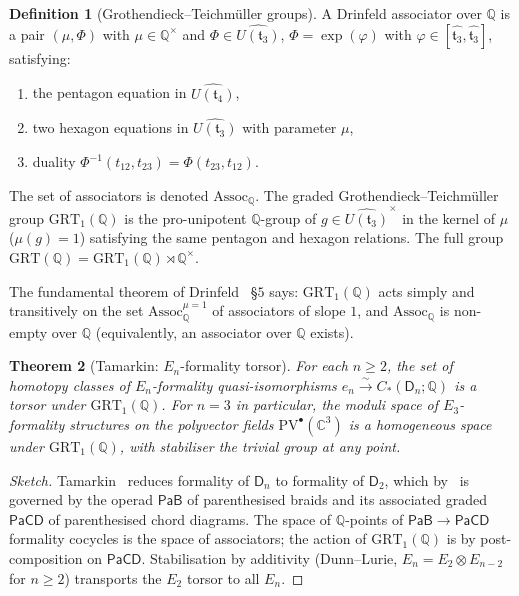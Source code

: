 \documentclass[11pt]{amsart}
\theoremstyle{plain}
\newtheorem{theorem}{Theorem}[section]
\theoremstyle{definition}
\newtheorem{definition}[theorem]{Definition}
\theoremstyle{remark}
\providecommand{\C}{\mathbb{C}}
\providecommand{\Q}{\mathbb{Q}}
\providecommand{\GRT}{\mathrm{GRT}}
\providecommand{\PaB}{\mathsf{PaB}}
\providecommand{\PaCD}{\mathsf{PaCD}}
\providecommand{\frakt}{\mathfrak{t}}
\providecommand{\PV}{\mathrm{PV}}
\begin{document}
\begin{definition}[Grothendieck--Teichm\"uller groups]
\label{def:gt-grt}
A Drinfeld associator over $\Q$ is a pair $(\mu, \Phi)$ with $\mu \in \Q^\times$ and $\Phi \in \widehat{U(\frakt_3)}$, $\Phi = \exp(\varphi)$ with $\varphi \in [\widehat{\frakt_3}, \widehat{\frakt_3}]$, satisfying:
\begin{enumerate}
\item the pentagon equation in $\widehat{U(\frakt_4)}$,
\item two hexagon equations in $\widehat{U(\frakt_3)}$ with parameter $\mu$,
\item duality $\Phi^{-1}(t_{12}, t_{23}) = \Phi(t_{23}, t_{12})$.
\end{enumerate}
The set of associators is denoted $\mathrm{Assoc}_\Q$. The graded Grothendieck--Teichm\"uller group $\GRT_1(\Q)$ is the pro-unipotent $\Q$-group of $g \in \widehat{U(\frakt_3)}^\times$ in the kernel of $\mu$ \textup{(}$\mu(g) = 1$\textup{)} satisfying the same pentagon and hexagon relations. The full group $\GRT(\Q) = \GRT_1(\Q) \rtimes \Q^\times$.
\end{definition}

The fundamental theorem of Drinfeld~\cite{Drinfeld1990} \S$5$ says: $\GRT_1(\Q)$ acts simply and transitively on the set $\mathrm{Assoc}_\Q^{\mu = 1}$ of associators of slope $1$, and $\mathrm{Assoc}_\Q$ is non-empty over $\Q$ \textup{(}equivalently, an associator over $\Q$ exists\textup{)}.

\begin{theorem}[Tamarkin: $E_n$-formality torsor]
\label{thm:tamarkin-torsor}
For each $n \geq 2$, the set of homotopy classes of $E_n$-formality quasi-isomorphisms $e_n \xrightarrow{\sim} C_*(\mathsf{D}_n; \Q)$ is a torsor under $\GRT_1(\Q)$. For $n = 3$ in particular, the moduli space of $E_3$-formality structures on the polyvector fields $\PV^\bullet(\C^3)$ is a homogeneous space under $\GRT_1(\Q)$, with stabiliser the trivial group at any point.
\end{theorem}

\begin{proof}[Sketch]
Tamarkin~\cite{Tamarkin1998, Tamarkin2003} reduces formality of $\mathsf{D}_n$ to formality of $\mathsf{D}_2$, which by~\cite{Tamarkin1998} is governed by the operad $\PaB$ of parenthesised braids and its associated graded $\PaCD$ of parenthesised chord diagrams. The space of $\Q$-points of $\PaB \to \PaCD$ formality cocycles is the space of associators; the action of $\GRT_1(\Q)$ is by post-composition on $\PaCD$. Stabilisation by additivity \textup{(}Dunn--Lurie, $E_n = E_2 \otimes E_{n-2}$ for $n \geq 2$\textup{)} transports the $E_2$ torsor to all $E_n$.
\end{proof}
\end{document}
